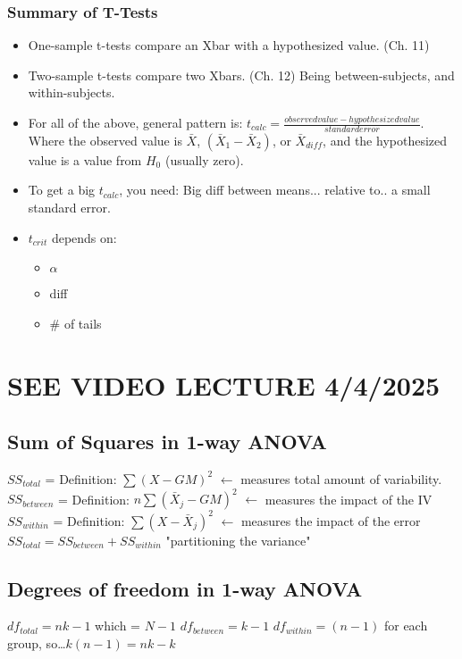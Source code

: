 \documentclass[11pt]{report}
\begin{document}
\subsubsection{Summary of T-Tests}
\begin{itemize}
    \item One-sample t-tests compare an Xbar with a hypothesized value. (Ch. 11)
    \item Two-sample t-tests compare two Xbars. (Ch. 12) Being between-subjects, and within-subjects.
    \item For all of the above, general pattern is: $t_{calc} = \frac{observed value - hypothesized value}{standard error}$. Where the observed value is $\bar{X}$, $(\bar{X}_{1} - \bar{X}_{2})$, or $\bar{X}_{diff}$, and the hypothesized value is a value from $H_0$ (usually zero).
    \item To get a big $t_{calc}$, you need: Big diff between means... relative to.. a small standard error.
    \item $t_{crit}$ depends on:
    \begin{itemize}
        \item $\alpha$
        \item diff
        \item \# of tails
    \end{itemize}
\end{itemize}

\section{SEE VIDEO LECTURE 4/4/2025}

\subsection{Sum of Squares in 1-way ANOVA}
$SS_{total}$ = Definition: $\sum(X - GM)^2$ $\leftarrow$ measures total amount of variability. \newline
$SS_{between}$ = Definition: $n\sum(\bar{X}_j - GM)^2$ $\leftarrow$ measures the impact of the IV \newline
$SS_{within}$ = Definition: $\sum(X - \bar{X}_j)^2$ $\leftarrow$ measures the impact of the error \newline
$SS_{total} = SS_{between} + SS_{within}$ "partitioning the variance" \newline

\subsection{Degrees of freedom in 1-way ANOVA}
$df_{total} = nk - 1$ which = $N - 1$ \newline
$df_{between} = k - 1$ \newline
$df_{within} = (n - 1)$ for each group, so\dots $k(n - 1) = nk - k$ \newline
\end{document}
